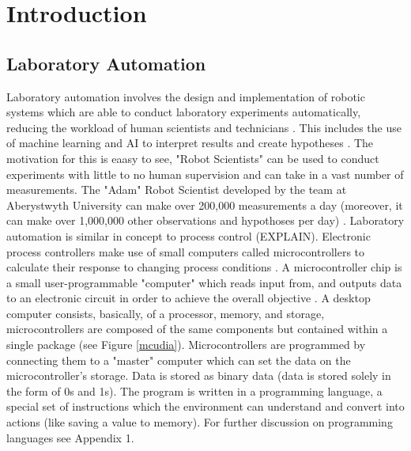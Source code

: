 \documentclass{report}
\begin{document}
	\newpage
	\setcounter{page}{1}
	
	\chapter*{Introduction}



	\section{Laboratory Automation}
	Laboratory automation involves the design and implementation of robotic systems which are able to conduct laboratory experiments automatically, reducing the workload of human scientists and technicians \cite{backwhatisauto}. This includes the use of machine learning and AI to interpret results and create hypotheses \cite{backlitrevai, backbaconauto, backlabauto}. The motivation for this is eaasy to see, "Robot Scientists" can be used to conduct experiments with little to no human supervision and can take in a vast number of measurements. The "Adam" Robot Scientist developed by the team at Aberystwyth University can make over 200,000 measurements a day (moreover, it can make over 1,000,000 other observations and hypothoses per day)  \cite{backontorobsci}.\newline \newline \noindent
	Laboratory automation is similar in concept to process control (EXPLAIN). Electronic process controllers make use of small computers called microcontrollers to calculate their response to changing process conditions \cite{backprocautotheory}. A microcontroller chip is a small user-programmable "computer" which reads input from, and outputs data to an electronic circuit in order to achieve the overall objective \cite{backwhatismc}. A desktop computer consists, basically, of a processor, memory, and storage, microcontrollers are composed of the same components but contained within a single package (see Figure \ref{mcudia}). Microcontrollers are programmed by connecting them to a "master" computer which can set the data on the microcontroller's storage. Data is stored as binary data (data is stored solely in the form of 0s and 1s). The program is written in a programming language, a special set of instructions which the environment can understand and convert into actions (like saving a value to memory). For further discussion on programming languages see Appendix 1.
\end{document}
